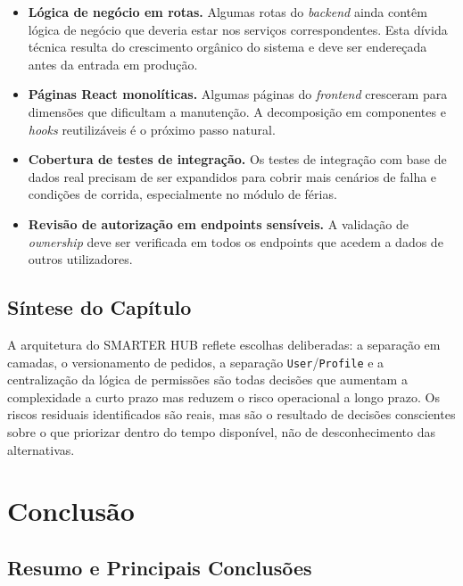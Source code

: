 \documentclass[12pt, a4paper, twoside, openright]{report}
\begin{document}
\begin{itemize}
  \item \textbf{Lógica de negócio em rotas.} Algumas rotas do \textit{backend}
        ainda contêm lógica de negócio que deveria estar nos serviços correspondentes.
        Esta dívida técnica resulta do crescimento orgânico do sistema e deve ser
        endereçada antes da entrada em produção.
  \item \textbf{Páginas React monolíticas.} Algumas páginas do \textit{frontend}
        cresceram para dimensões que dificultam a manutenção. A decomposição em
        componentes e \textit{hooks} reutilizáveis é o próximo passo natural.
  \item \textbf{Cobertura de testes de integração.} Os testes de integração com
        base de dados real precisam de ser expandidos para cobrir mais cenários
        de falha e condições de corrida, especialmente no módulo de férias.
  \item \textbf{Revisão de autorização em endpoints sensíveis.} A validação de
        \textit{ownership} deve ser verificada em todos os endpoints que acedem
        a dados de outros utilizadores.
\end{itemize}

\section{Síntese do Capítulo}

A arquitetura do SMARTER HUB reflete escolhas deliberadas: a separação em camadas,
o versionamento de pedidos, a separação \texttt{User}/\texttt{Profile} e a centralização
da lógica de permissões são todas decisões que aumentam a complexidade a curto prazo
mas reduzem o risco operacional a longo prazo. Os riscos residuais identificados são
reais, mas são o resultado de decisões conscientes sobre o que priorizar dentro do
tempo disponível, não de desconhecimento das alternativas.

\chapter{Conclusão}
\label{cap:conclusao}

\section{Resumo e Principais Conclusões}
\end{document}
